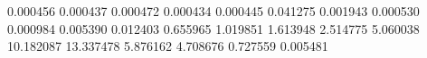 0.000456
0.000437
0.000472
0.000434
0.000445
0.041275
0.001943
0.000530
0.000984
0.005390
0.012403
0.655965
1.019851
1.613948
2.514775
5.060038
10.182087
13.337478
5.876162
4.708676
0.727559
0.005481
